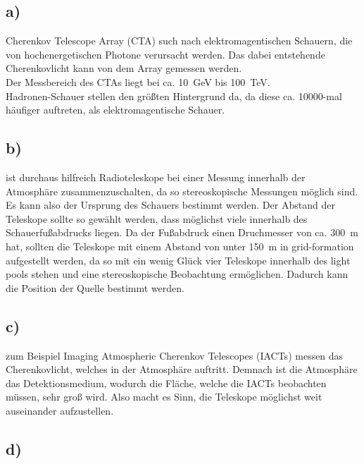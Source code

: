 \subsection{a)}

    \justifying Cherenkov Telescope Array (CTA) such nach elektromagentischen Schauern, die von hochenergetischen
    Photone verursacht werden. Das dabei entstehende Cherenkovlicht kann von dem Array gemessen werden.\\
    Der Messbereich des CTAs liegt bei ca. \SI{10}{\giga\electronvolt} bis \SI{100}{\tera\electronvolt}.\\
    Hadronen-Schauer stellen den größten Hintergrund da, da diese ca. 10000-mal häufiger auftreten, als 
    elektromagentische Schauer.

\subsection{b)}

    \justifying ist durchaus hilfreich Radioteleskope bei einer Messung innerhalb der Atmosphäre 
    zusammenzuschalten, da so stereoskopische Messungen möglich sind. Es kann also der Ursprung des Schauers bestimmt
    werden. Der Abstand der Teleskope sollte so gewählt werden, dass möglichst viele innerhalb des Schauerfußabdrucks 
    liegen. Da der Fußabdruck einen Druchmesser von ca. \SI{300}{\meter} hat, sollten die Teleskope mit einem Abstand von unter
    \SI{150}{\meter} in grid-formation aufgestellt werden, da so mit ein wenig Glück vier Teleskope innerhalb des light pools
    stehen und eine stereoskopische Beobachtung ermöglichen. Dadurch kann die Position der Quelle bestimmt werden. 

\subsection{c)}

    \justifying zum Beispiel Imaging Atmospheric Cherenkov Telescopes (IACTs) messen das Cherenkovlicht, welches in der 
    Atmosphäre auftritt. Demnach ist die Atmosphäre das Detektionsmedium, wodurch die Fläche, welche die IACTs beobachten müssen, sehr groß
    wird. Also macht es Sinn, die Teleskope möglichst weit auseinander aufzustellen.  

\subsection{d)}

